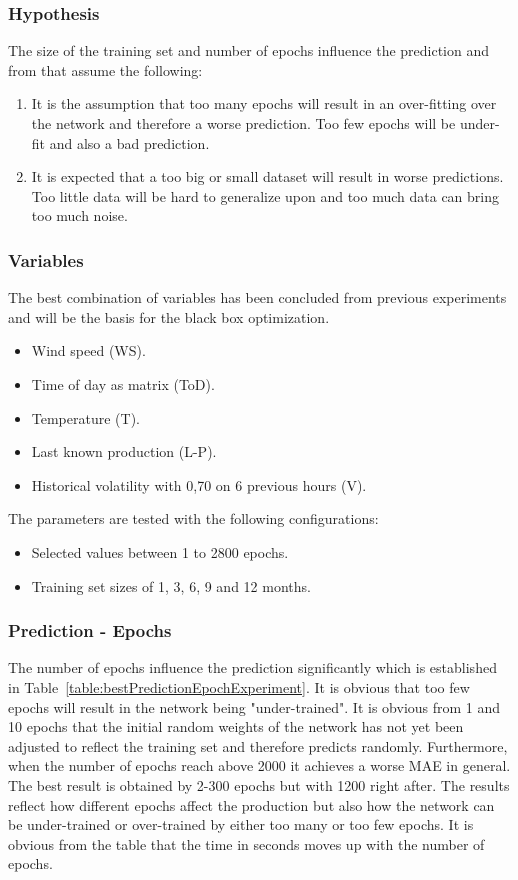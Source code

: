 \subsubsection{Hypothesis}
The size of the training set and number of epochs influence the prediction and from that assume the following:
\begin{enumerate}
\item It is the assumption that too many epochs will result in an over-fitting over the network and therefore a worse prediction. Too few epochs will be under-fit and also a bad prediction.
\item It is expected that a too big or small dataset will result in worse predictions. Too little data will be hard to generalize upon and too much data can bring too much noise.
\end{enumerate}

\subsubsection{Variables}
The best combination of variables has been concluded from previous experiments and will be the basis for the black box optimization. 

\begin{itemize}
\item Wind speed (WS).
\item Time of day as matrix (ToD).
\item Temperature (T).
\item Last known production (L-P).
\item Historical volatility with 0,70 on 6 previous hours (V).
\end{itemize}

The parameters are tested with the following configurations:

\begin{itemize}
\item Selected values between 1 to 2800 epochs.
\item Training set sizes of 1, 3, 6, 9 and 12 months.
\end{itemize}

\subsubsection{Prediction - Epochs}
The number of epochs influence the prediction significantly which is established in Table~\ref{table:bestPredictionEpochExperiment}. It is obvious that too few epochs will result in the network being "under-trained". It is obvious from 1 and 10 epochs that the initial random weights of the network has not yet been adjusted to reflect the training set and therefore predicts randomly. Furthermore, when the number of epochs reach above 2000 it achieves a worse MAE in general. The best result is obtained by 2-300 epochs but with 1200 right after. The results reflect how different epochs affect the production but also how the network can be under-trained or over-trained by either too many or too few epochs. It is obvious from the table that the time in seconds moves up with the number of epochs.


